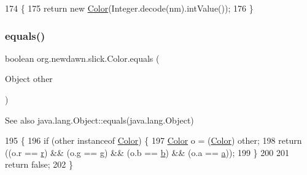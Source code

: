 \begin{DoxyCode}
174                                           \{
175         \textcolor{keywordflow}{return} \textcolor{keyword}{new} \mbox{\hyperlink{classorg_1_1newdawn_1_1slick_1_1_color_a39db992a7910141605cc2acb953c4917}{Color}}(Integer.decode(nm).intValue());
176     \}
\end{DoxyCode}
\mbox{\label{classorg_1_1newdawn_1_1slick_1_1_color_afb41da8a2f86595dc51c6a2e9712027e}} 
\subsubsection{\texorpdfstring{equals()}{equals()}}
{\footnotesize\ttfamily boolean org.\+newdawn.\+slick.\+Color.\+equals (\begin{DoxyParamCaption}\item[{Object}]{other }\end{DoxyParamCaption})\hspace{0.3cm}{\ttfamily [inline]}}

\begin{DoxySeeAlso}{See also}
java.\+lang.\+Object\+::equals(java.\+lang.\+Object) 
\end{DoxySeeAlso}

\begin{DoxyCode}
195                                         \{
196         \textcolor{keywordflow}{if} (other instanceof \mbox{\hyperlink{classorg_1_1newdawn_1_1slick_1_1_color_a39db992a7910141605cc2acb953c4917}{Color}}) \{
197             \mbox{\hyperlink{classorg_1_1newdawn_1_1slick_1_1_color_a39db992a7910141605cc2acb953c4917}{Color}} o = (\mbox{\hyperlink{classorg_1_1newdawn_1_1slick_1_1_color_a39db992a7910141605cc2acb953c4917}{Color}}) other;
198             \textcolor{keywordflow}{return} ((o.r == \mbox{\hyperlink{classorg_1_1newdawn_1_1slick_1_1_color_ac07fa95108064b044dcf9a53e95dcb48}{r}}) && (o.g == \mbox{\hyperlink{classorg_1_1newdawn_1_1slick_1_1_color_aa6ebff7c102a1476e7b511a78397b753}{g}}) && (o.b == \mbox{\hyperlink{classorg_1_1newdawn_1_1slick_1_1_color_a8c0cef152e16438fee852a97e50ef7a5}{b}}) && (o.a == \mbox{\hyperlink{classorg_1_1newdawn_1_1slick_1_1_color_ab9288c822ff7614a77c887eb8c2595a7}{a}}));
199         \}
200         
201         \textcolor{keywordflow}{return} \textcolor{keyword}{false};
202     \}
\end{DoxyCode}
\mbox{\label{classorg_1_1newdawn_1_1slick_1_1_color_a82aae8104a9657925af03ab0da1bc4f2}} 
